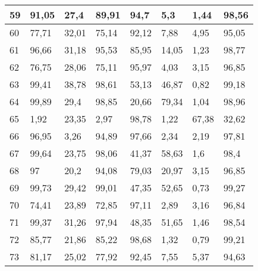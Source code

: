 \begin{longtable}[c]{|l|l|l|l|l|l|l|l|}
59              & 91,05        & 27,4         & 89,91       & 94,7          & 5,3           & 1,44          & 98,56         \\ \hline
60              & 77,71        & 32,01        & 75,14       & 92,12         & 7,88          & 4,95          & 95,05         \\ \hline
61              & 96,66        & 31,18        & 95,53       & 85,95         & 14,05         & 1,23          & 98,77         \\ \hline
62              & 76,75        & 28,06        & 75,11       & 95,97         & 4,03          & 3,15          & 96,85         \\ \hline
63              & 99,41        & 38,78        & 98,61       & 53,13         & 46,87         & 0,82          & 99,18         \\ \hline
64              & 99,89        & 29,4         & 98,85       & 20,66         & 79,34         & 1,04          & 98,96         \\ \hline
65              & 1,92         & 23,35        & 2,97        & 98,78         & 1,22          & 67,38         & 32,62         \\ \hline
66              & 96,95        & 3,26         & 94,89       & 97,66         & 2,34          & 2,19          & 97,81         \\ \hline
67              & 99,64        & 23,75        & 98,06       & 41,37         & 58,63         & 1,6           & 98,4          \\ \hline
68              & 97           & 20,2         & 94,08       & 79,03         & 20,97         & 3,15          & 96,85         \\ \hline
69              & 99,73        & 29,42        & 99,01       & 47,35         & 52,65         & 0,73          & 99,27         \\ \hline
70              & 74,41        & 23,89        & 72,85       & 97,11         & 2,89          & 3,16          & 96,84         \\ \hline
71              & 99,37        & 31,26        & 97,94       & 48,35         & 51,65         & 1,46          & 98,54         \\ \hline
72              & 85,77        & 21,86        & 85,22       & 98,68         & 1,32          & 0,79          & 99,21         \\ \hline
73              & 81,17        & 25,02        & 77,92       & 92,45         & 7,55          & 5,37          & 94,63         \\ \hline

\end{longtable}
